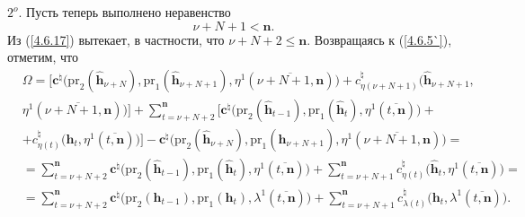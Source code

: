 \documentclass[12pt,twoside]{report}
\newcommand{\bfn}{\begin{equation}}
\newcommand{\efn}{\end{equation}}
\newcommand{\ov}{\overline}
\newcommand{\Om}{\Omega}
\newcommand{\la}{\lambda}
\newcommand{\zc}{{\mathbf c}}
\newcommand{\nn}{{\mathbf n}}
\begin{document}
{{$2^o.$ Пусть теперь выполнено неравенство
\bfn\label{4.6.17}\nu+N+1 < \nn.
\efn
Из (\ref{4.6.17}) вытекает, в частности, что $\nu+N+2 \leqslant \nn.$ Возвращаясь к (\ref{4.6.5`}), отметим, что
\begin{eqnarray}
&\Om = \bigl[\zc^\natural\bigl(\mathrm{pr}_2(\hat{\mathbf{h}}_{\nu+N}),\mathrm{pr}_1(\hat{\mathbf{h}}_{\nu+N+1}),
 \eta^1(\ov{\nu+N+1,\nn})\bigl) + c_{\eta(\nu+N+1)}^\natural\bigl(\hat{\mathbf{h}}_{\nu+N+1},
&\nonumber\\
&\eta^1(\ov{\nu+N+1,\nn})\bigl)\bigl] + \sum\limits_{t=\nu+N+2}^\nn\bigl[
\zc^\natural\bigl(\mathrm{pr}_2(\hat{\mathbf{h}}_{t-1}),\mathrm{pr}_1(\hat{\mathbf{h}}_t),
 \eta^1(\ov{t,\nn})\bigl) +
&\nonumber\\
&+ c_{\eta(t)}^\natural\bigl(\hat{\mathbf{h}}_t,\eta^1(\ov{t,\nn})\bigl)\bigl]-
\zc^\natural\bigl(\mathrm{pr}_2(\hat{\mathbf{h}}_{\nu+N}),\mathrm{pr}_1(\hat{\mathbf{h}}_{\nu+N+1}),
\eta^1(\ov{\nu+N+1,\nn})\bigl) =
&\nonumber\\
&= \sum\limits_{t=\nu+N+2}^\nn    \zc^\natural\bigl(\mathrm{pr}_2(\hat{\mathbf{h}}_{t-1}),
\mathrm{pr}_1(\hat{\mathbf{h}}_t),
\eta^1(\ov{t,\nn})\bigl) + \sum\limits_{t=\nu+N+1}^\nn c_{\eta(t)}^\natural\bigl(\hat{\mathbf{h}}_t,
\eta^1(\ov{t,\nn})\bigl) =
&\nonumber\\
&=  \sum\limits_{t=\nu+N+2}^\nn    \zc^\natural\bigl(\mathrm{pr}_2(\mathbf{h}_{t-1}),\mathrm{pr}_1(\mathbf{h}_t),
 \la^1(\ov{t,\nn})\bigl) +  \sum\limits_{t=\nu+N+1}^\nn c_{\la(t)}^\natural\bigl(\mathbf{h}_t, \la^1(\ov{t,\nn})\bigl).
&\label{4.6.18}
\end{eqnarray}

}}
\end{document}
